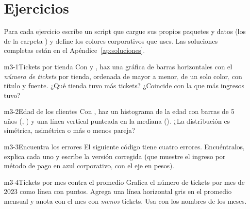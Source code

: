 \section{Ejercicios}
\label{sec:m3-ejercicios}

Para cada ejercicio escribe un script que cargue sus propios paquetes y
datos (los de la carpeta ) y define los colores
corporativos que uses. Las soluciones completas están en el
Apéndice~\ref{ap:soluciones}.

\begin{ejercicio}{m3-1}{Tickets por tienda}
Con  y , haz una gráfica de
barras horizontales con el \emph{número de tickets} por tienda, ordenada de
mayor a menor, de un solo color, con título y fuente. ¿Qué tienda tuvo más
tickets? ¿Coincide con la que más ingresos tuvo?
\end{ejercicio}

\begin{ejercicio}{m3-2}{Edad de los clientes}
Con , haz un histograma de la edad con barras de 5
años (, ) y una línea vertical
punteada en la mediana (). ¿La distribución es
simétrica, asimétrica o más o menos pareja?
\end{ejercicio}

\begin{ejercicio}{m3-3}{Encuentra los errores}
El siguiente código tiene cuatro errores. Encuéntralos, explica cada uno y
escribe la versión corregida (que muestre el ingreso por método de pago en
azul corporativo, con el eje en pesos).
\end{ejercicio}

\begin{ejercicio}{m3-4}{Tickets por mes contra el promedio}
Grafica el número de tickets por mes de 2023 como línea con puntos. Agrega
una línea horizontal gris en el promedio mensual y anota con
 el mes con \emph{menos} tickets. Usa
 con los nombres de los meses.
\end{ejercicio}

